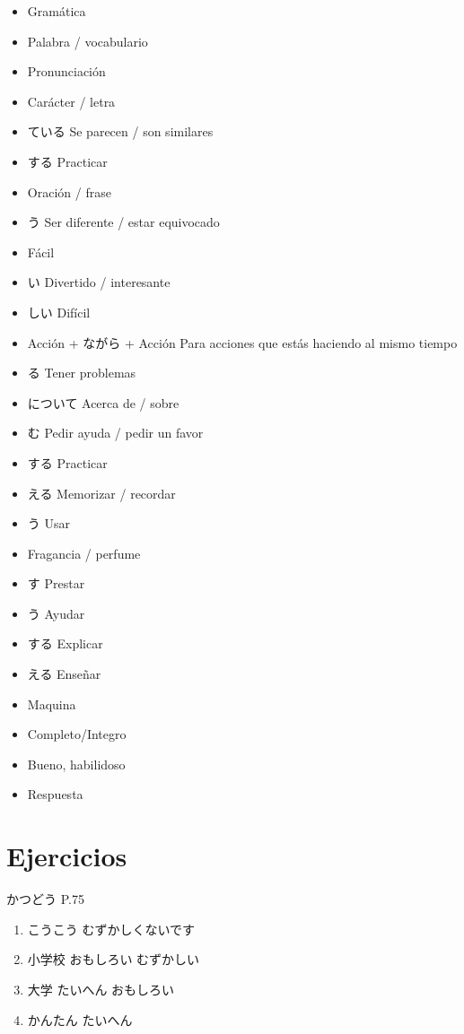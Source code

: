 \documentclass[a4paper,lualatex,ja=standard,base=10pt]{bxjsarticle}
\begin{document}
\begin{itemize}
  \item {} Gramática
  \item {} Palabra / vocabulario
  \item {} Pronunciación
  \item {} Carácter / letra
  \item {}ている Se parecen / son similares
  \item {}する Practicar
  \item {} Oración / frase
  \item {}う Ser diferente / estar equivocado
  \item {} Fácil
  \item {}い Divertido / interesante
  \item {}しい Difícil
  \item Acción + ながら + Acción Para acciones que estás haciendo al mismo tiempo
  \item {}る Tener problemas
  \item について Acerca de / sobre
  \item {}む Pedir ayuda / pedir un favor
  \item {}する Practicar
  \item {}える Memorizar / recordar
  \item {}う Usar
  \item {} Fragancia / perfume
  \item {}す Prestar
  \item {}う Ayudar
  \item {}する Explicar
  \item {}える Enseñar
  \item {} Maquina
  \item {} Completo/Integro
  \item {} Bueno, habilidoso
  \item {} Respuesta
\end{itemize}

\section{Ejercicios}

かつどう P.75

\begin{enumerate}
  \item こうこう むずかしくないです
  \item 小学校 おもしろい むずかしい
  \item 大学 たいへん おもしろい
  \item かんたん たいへん
\end{enumerate}
\end{document}
